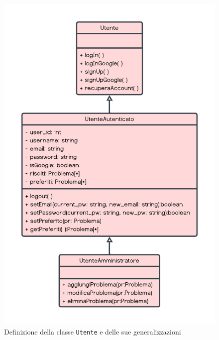 \documentclass[11pt, a4paper]{article}
\theoremstyle{definition} %
\begin{document}
\begin{figure}[H]
\centering
\includegraphics[scale = 0.71]{materiale/class-utenti.pdf}
\caption{Definizione della classe \texttt{Utente} e delle sue generalizzazioni}
\label{utenti}
\end{figure}
\end{document}
